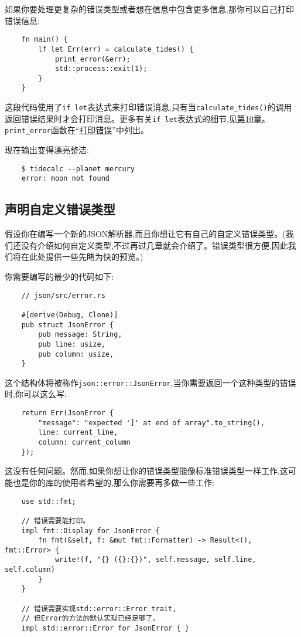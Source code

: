 如果你要处理更复杂的错误类型或者想在信息中包含更多信息,那你可以自己打印错误信息:
\begin{verbatim}
    fn main() {
        lf let Err(err) = calculate_tides() {
            print_error(&err);
            std::process::exit(1);
        }
    }
\end{verbatim}

这段代码使用了\texttt{if let}表达式来打印错误消息,只有当\texttt{calculate\_tides()}的调用返回错误结果时才会打印消息。更多有关\texttt{if let}表达式的细节,见\hyperref[ch10]{第10章}。\texttt{print\_error}函数在“\hyperref[printerror]{打印错误}”中列出。

现在输出变得漂亮整洁:
\begin{verbatim}
    $ tidecalc --planet mercury
    error: moon not found
\end{verbatim}

\subsection{声明自定义错误类型}
假设你在编写一个新的JSON解析器,而且你想让它有自己的自定义错误类型。(我们还没有介绍如何自定义类型,不过再过几章就会介绍了。错误类型很方便,因此我们将在此处提供一些先睹为快的预览。)

你需要编写的最少的代码如下:
\begin{verbatim}
    // json/src/error.rs

    #[derive(Debug, Clone)]
    pub struct JsonError {
        pub message: String,
        pub line: usize,
        pub column: usize,
    }
\end{verbatim}

这个结构体将被称作\texttt{json::error::JsonError},当你需要返回一个这种类型的错误时,你可以这么写:
\begin{verbatim}
    return Err(JsonError {
        "message": "expected ']' at end of array".to_string(),
        line: current_line,
        column: current_column
    });
\end{verbatim}

这没有任何问题。然而,如果你想让你的错误类型能像标准错误类型一样工作,这可能也是你的库的使用者希望的,那么你需要再多做一些工作:
\begin{verbatim}
    use std::fmt;

    // 错误需要能打印。
    impl fmt::Display for JsonError {
        fn fmt(&self, f: &mut fmt::Formatter) -> Result<(), fmt::Error> {
            write!(f, "{} ({}:{})", self.message, self.line, self.column)
        }
    }

    // 错误需要实现std::error::Error trait,
    // 但Error的方法的默认实现已经足够了。
    impl std::error::Error for JsonError { }
\end{verbatim}

